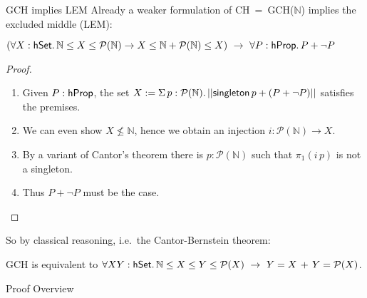 \documentclass[xcolor=dvipsnames,compress,aspectratio=169]{beamer}
\newcommand{\MBB}[1]{\ensuremath{\mathbb{#1}}\xspace}  %
\newcommand{\MCL}[1]{\ensuremath{\mathcal{#1}}\xspace} %
\newcommand{\Nat}{\MBB{N}}   %
\newcommand{\Pow}{\MCL P}
\begin{document}
\begin{frame}{GCH implies LEM}
	Already a weaker formulation of CH$~=~$GCH($\Nat$) implies the excluded middle (LEM):
	\begin{fact}
		$(\forall X:\hset.\,\Nat \le X\le \Pow(\Nat)\to X\le \Nat+ \Pow(\Nat)\le X)~\to~\forall P:\hprop.\,P+\neg P$
	\end{fact}
	\pause
	\begin{proof}
		\begin{enumerate}
			\pause
			\item
			Given $P:\mathsf{hProp}$, the set $X:=\Sigma\, p:\Pow(\Nat).\,\trunc{\mathsf{singleton}\,p+ (P+\neg P)}$ satisfies the premises.
			\pause
			\item
			We can even show $X\not\le \Nat$, hence we obtain an injection $i:\Pow(\Nat)\to X$.
			\pause
			\item
			By a variant of Cantor's theorem there is $p:\Pow(\Nat)$ such that $\pi_1(i\,p)$ is not a singleton.
			\pause
			\item
			Thus $P+\neg P$ must be the case.
			\qedhere
		\end{enumerate}
	\end{proof}
	\pause
	So by classical reasoning, i.e.\ the Cantor-Bernstein theorem:
	\begin{corollary}
		GCH is equivalent to $\forall X Y:\hset.\,\Nat \le X\le Y\le \Pow(X)~\to~ Y = X \,+\, Y=\Pow(X) $.
	\end{corollary}
\end{frame}

\begin{frame}
	\Huge
	\centering
	Proof Overview
\end{frame}
\end{document}
